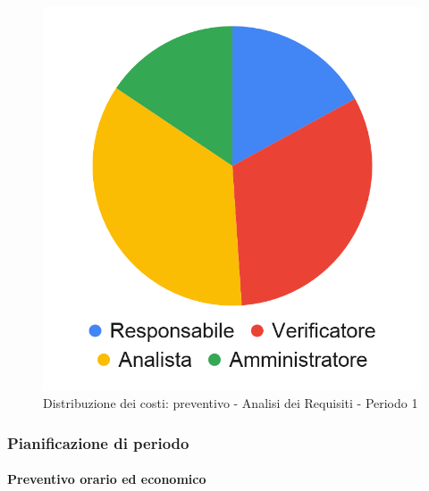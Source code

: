 \hspace{-1cm}
\begin{minipage}{.50\textwidth}
\smallPreventivoTable{
	
}
\end{minipage}
\hspace{1cm}
\begin{minipage}{.40\textwidth}
\begin{figure}[H]
	\includegraphics[scale=0.21]{res/images/charts/preventivo_priori/Grafico4-1.png}
	\caption{Distribuzione dei costi: preventivo - Analisi dei Requisiti - Periodo 1}
\end{figure}\end{minipage} 


\subsubsection{Pianificazione di periodo}

\paragraph{Preventivo orario ed economico}
\subparagraph*{}

\contabilitaTable{
	
}


